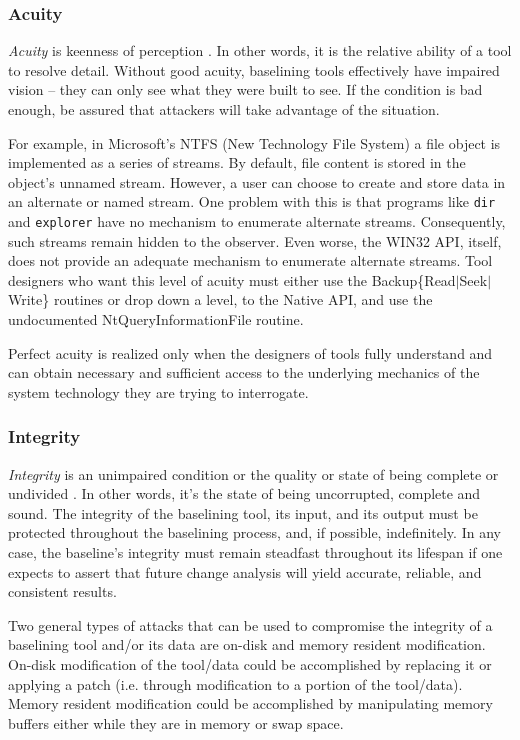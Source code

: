 \documentclass[10pt]{article}
\begin{document}
\subsubsection{Acuity}

{\it Acuity} is keenness of perception \cite{dictionary}.  In other
words, it is the relative ability of a tool to resolve detail.
Without good acuity, baselining tools effectively have impaired
vision -- they can only see what they were built to see.  If the
condition is bad enough, be assured that attackers will take
advantage of the situation.

For example, in Microsoft's NTFS (New Technology File System) a
file object is implemented as a series of streams.  By default,
file content is stored in the object's unnamed stream.  However,
a user can choose to create and store data in an alternate or named
stream.  One problem with this is that programs like \texttt{dir}
and \texttt{explorer} have no mechanism to enumerate alternate
streams.  Consequently, such streams remain hidden to the observer.
Even worse, the WIN32 API, itself, does not provide an adequate
mechanism to enumerate alternate streams.  Tool designers who want
this level of acuity must either use the
Backup\{Read$\mid$Seek$\mid$Write\} routines or drop down a level,
to the Native API, and use the undocumented NtQueryInformationFile
routine.

Perfect acuity is realized only when the designers of tools fully
understand and can obtain necessary and sufficient access to the
underlying mechanics of the system technology they are trying to
interrogate.

\subsubsection{Integrity}

{\it Integrity} is an unimpaired condition or the quality or state
of being complete or undivided \cite{dictionary}.  In other words,
it's the state of being uncorrupted, complete and sound.  The
integrity of the baselining tool, its input, and its output must
be protected throughout the baselining process, and, if possible,
indefinitely.  In any case, the baseline's integrity must remain
steadfast throughout its lifespan if one expects to assert that
future change analysis will yield accurate, reliable, and consistent
results.

Two general types of attacks that can be used to compromise the
integrity of a baselining tool and/or its data are on-disk and
memory resident modification.  On-disk modification of the tool/data
could be accomplished by replacing it or applying a patch (i.e.
through modification to a portion of the tool/data).  Memory resident
modification could be accomplished by manipulating memory buffers
either while they are in memory or swap space.
\end{document}
